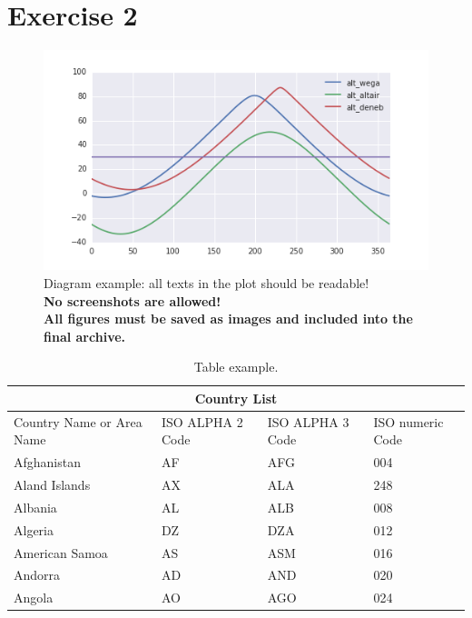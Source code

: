 \documentclass[a4paper]{article}
\begin{document}
\lipsum[2]

\section*{Exercise 2}

\lipsum[1]

\begin{figure}[h!]
    \centering
    \includegraphics[width=0.65\linewidth]{images/diagram_1.png}
    \caption{Diagram example: all texts in the plot should be readable! \\ {\color{red}\textbf{No screenshots are allowed! \\ All figures must be saved as images and included into the final archive.}} }
    \label{fig:my_label}
\end{figure}


\begin{table}[h!]
    \centering
    \begin{tabular}{ |p{3cm}||p{3cm}|p{3cm}|p{3cm}|  }
     \hline
     \multicolumn{4}{|c|}{Country List} \\
     \hline
     Country Name     or Area Name& ISO ALPHA 2 Code &ISO ALPHA 3 Code&ISO numeric Code\\
     \hline
     Afghanistan   & AF    &AFG&   004\\
     Aland Islands&   AX  & ALA   &248\\
     Albania &AL & ALB&  008\\
     Algeria    &DZ & DZA&  012\\
     American Samoa&   AS  & ASM&016\\
     Andorra& AD  & AND   &020\\
     Angola& AO  & AGO&024\\
     \hline
    \end{tabular}
    \caption{Table example.}
    \label{tab:my_label}
\end{table}

\lipsum[3]
\end{document}
